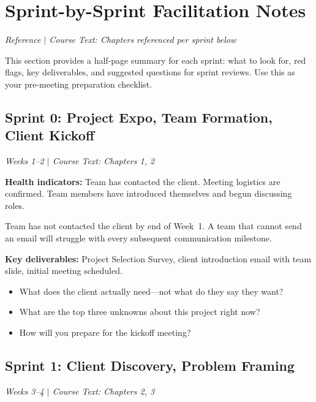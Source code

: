 \section{Sprint-by-Sprint Facilitation Notes}
\textit{Reference $|$ Course Text: Chapters referenced per sprint below}

This section provides a half-page summary for each sprint: what to look for, red flags, key deliverables, and suggested questions for sprint reviews. Use this as your pre-meeting preparation checklist.


\subsection{Sprint 0: Project Expo, Team Formation, Client Kickoff}
\textit{Weeks 1--2 $|$ Course Text: Chapters 1, 2}

\textbf{Health indicators:} Team has contacted the client. Meeting logistics are confirmed. Team members have introduced themselves and begun discussing roles.

\begin{redflag}
Team has not contacted the client by end of Week~1. A team that cannot send an email will struggle with every subsequent communication milestone.
\end{redflag}

\textbf{Key deliverables:} Project Selection Survey, client introduction email with team slide, initial meeting scheduled.

\begin{paquestion}
\begin{itemize}[nosep,leftmargin=1.5em]
\item What does the client actually need---not what do they say they want?
\item What are the top three unknowns about this project right now?
\item How will you prepare for the kickoff meeting?
\end{itemize}
\end{paquestion}


\subsection{Sprint 1: Client Discovery, Problem Framing}
\textit{Weeks 3--4 $|$ Course Text: Chapters 2, 3}

